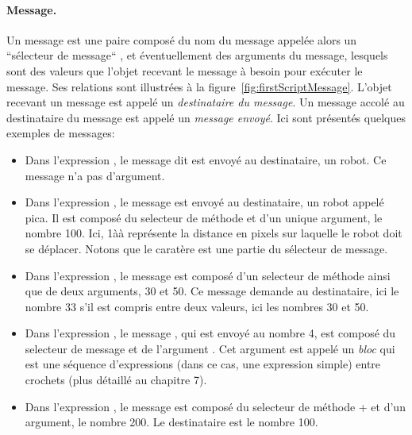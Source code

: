 \documentclass[a4paper,10pt,twoside]{book}
\begin{document}
\paragraph{Message.} 

Un message est une paire compos\'e du nom du message appel\'ee alors un ``s\'electeur de message`` , et \'eventuellement des arguments du message, lesquels sont des valeurs que l'objet recevant le message \`a besoin pour ex\'ecuter le message. Ses relations sont illustr\'ees \`a la figure~\ref{fig:firstScriptMessage}. L'objet recevant un message est appel\'e un \emph{destinataire du message}. Un message accol\'e au destinataire du message est appel\'e un \emph{message envoy\'e}. Ici sont pr\'esent\'es quelques exemples de messages:

\begin{itemize} 
\item Dans l'expression , le message dit  est envoy\'e au destinataire, un robot. Ce message n'a pas d'argument.

\item Dans l'expression , le message  est envoy\'e au destinataire, un robot appel\'e pica. Il est compos\'e du selecteur de m\'ethode  et d'un unique argument, le nombre 100. Ici, 1\`a\`a repr\'esente la distance en pixels sur laquelle le robot doit se d\'eplacer. Notons que le carat\`ere  est une partie du s\'electeur de message.

\item  Dans l'expression , le message  est compos\'e d'un selecteur de m\'ethode  ainsi que de deux arguments, 30 et 50. Ce message demande au destinataire, ici le nombre 33 s'il est compris entre deux valeurs, ici les nombres 30 et 50.

\item Dans l'expression , le message , qui est envoy\'e au nombre 4, est compos\'e du selecteur de message  et de l'argument \ct{[ pica go: 100 ]}. Cet argument est appel\'e un \emph{bloc} qui est une s\'equence d'expressions (dans ce cas, une expression simple) entre crochets (plus d\'etaill\'e au chapitre 7).

\item Dans l'expression , le message  est compos\'e du selecteur de m\'ethode + et d'un argument, le nombre 200. Le destinataire est le nombre 100.

\end{itemize}
\end{document}
